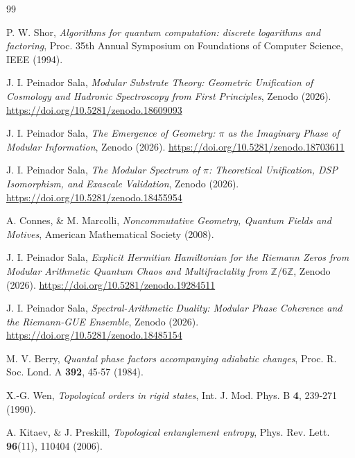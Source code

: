 \documentclass[12pt,a4paper]{article}
\theoremstyle{plain}
\theoremstyle{definition}
\theoremstyle{remark}
\begin{document}
\begin{thebibliography}{99}

P. W. Shor, \textit{Algorithms for quantum computation: discrete logarithms and factoring}, Proc. 35th Annual Symposium on Foundations of Computer Science, IEEE (1994).

J. I. Peinador Sala, \textit{Modular Substrate Theory: Geometric Unification of Cosmology and Hadronic Spectroscopy from First Principles}, Zenodo (2026). \url{https://doi.org/10.5281/zenodo.18609093}

J. I. Peinador Sala, \textit{The Emergence of Geometry: $\pi$ as the Imaginary Phase of Modular Information}, Zenodo (2026). \url{https://doi.org/10.5281/zenodo.18703611}

J. I. Peinador Sala, \textit{The Modular Spectrum of $\pi$: Theoretical Unification, DSP Isomorphism, and Exascale Validation}, Zenodo (2026). \url{https://doi.org/10.5281/zenodo.18455954}

A. Connes, \& M. Marcolli, \textit{Noncommutative Geometry, Quantum Fields and Motives}, American Mathematical Society (2008).

J. I. Peinador Sala, \textit{Explicit Hermitian Hamiltonian for the Riemann Zeros from Modular Arithmetic Quantum Chaos and Multifractality from $\mathbb{Z}/6\mathbb{Z}$}, Zenodo (2026). \url{https://doi.org/10.5281/zenodo.19284511}

J. I. Peinador Sala, \textit{Spectral-Arithmetic Duality: Modular Phase Coherence and the Riemann-GUE Ensemble}, Zenodo (2026). \url{https://doi.org/10.5281/zenodo.18485154}

M. V. Berry, \textit{Quantal phase factors accompanying adiabatic changes}, Proc. R. Soc. Lond. A \textbf{392}, 45-57 (1984).

X.-G. Wen, \textit{Topological orders in rigid states}, Int. J. Mod. Phys. B \textbf{4}, 239-271 (1990).

A. Kitaev, \& J. Preskill, \textit{Topological entanglement entropy}, Phys. Rev. Lett. \textbf{96}(11), 110404 (2006).


\end{thebibliography}
\end{document}
